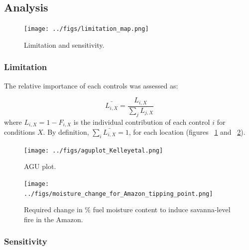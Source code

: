 \subsection{Analysis}


\begin{figure}[!ht]
  \centering
    \texttt{[image: ../figs/limitation\_map.png]}

  \caption{Limitation and sensitivity.}
  \label{fig:lim_sen_maps}
\end{figure}


\subsubsection{Limitation}

The relative importance of each controls was assessed as:

\begin{equation}
    \bar{L_{i, X}} = \frac{L_{i, X}}{\sum_{j} L_{j, X}}
\end{equation}
where $L_{i, X} = 1 - F_{i,X}$ is the individual contribution of each control $i$ for conditions $X$. By definition, $\sum_{i} \bar{L_{i,X}} = 1$, for each location (figures ~\ref{fig:lim_sen_maps} and ~\ref{fig:agu_plot}).


\begin{figure}[!ht]
  \centering
    \texttt{[image: ../figs/aguplot\_Kelleyetal.png]}

  \caption{AGU plot.}
  \label{fig:agu_plot}
\end{figure}


\begin{figure}[!ht]
  \centering
    \texttt{[image: ../figs/moisture\_change\_for\_Amazon\_tipping\_point.png]}

  \caption{Required change in \% fuel moisture content to induce savanna-level fire in the Amazon.}
  \label{fig:amazon}
\end{figure}

\subsubsection{Sensitivity}


